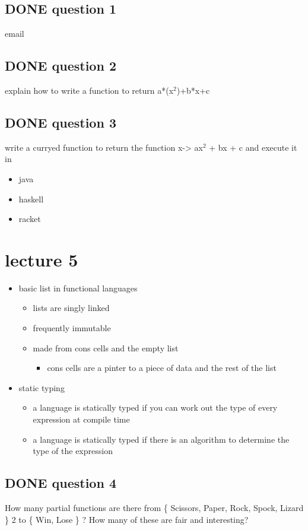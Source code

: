 \documentclass[11pt]{article}
\begin{document}
\subsection{{\bfseries\sffamily DONE} question 1}
\label{sec-3-2}
email
\subsection{{\bfseries\sffamily DONE} question 2}
\label{sec-3-3}
explain how to write a function to return a*(x$^{\text{2}}$)+b*x+c
\subsection{{\bfseries\sffamily DONE} question 3}
\label{sec-3-4}
write a curryed function to return the function x-> ax$^{\text{2}}$ + bx + c and execute it in 
\begin{itemize}
\item java
\item haskell
\item racket
\end{itemize}
\section{lecture 5}
\label{sec-4}
\begin{itemize}
\item basic list in functional languages
\begin{itemize}
\item lists are singly linked
\item frequently immutable
\item made from cons cells and the empty list
\begin{itemize}
\item cons cells are a pinter to a piece of data and the rest of the list
\end{itemize}
\end{itemize}
\item static typing
\begin{itemize}
\item a language is statically typed if you can work out the type of every expression at compile time
\item a language is statically typed if there is an algorithm to determine the type of the expression
\end{itemize}
\end{itemize}

\subsection{{\bfseries\sffamily DONE} question 4}
\label{sec-4-1}
How many partial functions are there from \{ Scissors, Paper, Rock, Spock, Lizard \} 2 to \{ Win, Lose \} ?
How many of these are fair and interesting?
\end{document}
